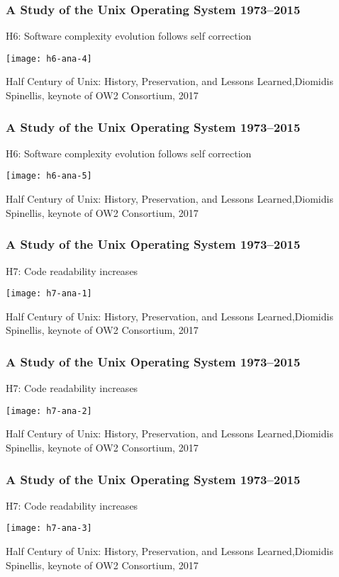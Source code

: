 \begin{frame}[plain]
	\frametitle{A Study of the Unix Operating System 1973–2015}
	\centering
	H6: Software complexity evolution
	follows self correction
	
	\texttt{[image: h6-ana-4]}
	
	\tiny Half Century of Unix:
	History, Preservation, and
	Lessons Learned,Diomidis Spinellis, keynote of OW2 Consortium, 2017
	
\end{frame}	


\begin{frame}[plain]
	\frametitle{A Study of the Unix Operating System 1973–2015}
	\centering
	H6: Software complexity evolution
	follows self correction
	
	\texttt{[image: h6-ana-5]}
	
	\tiny Half Century of Unix:
	History, Preservation, and
	Lessons Learned,Diomidis Spinellis, keynote of OW2 Consortium, 2017
	
\end{frame}	



\begin{frame}[plain]
	\frametitle{A Study of the Unix Operating System 1973–2015}
	\centering
	H7: Code readability increases
	
	\texttt{[image: h7-ana-1]}
	
	\tiny Half Century of Unix:
	History, Preservation, and
	Lessons Learned,Diomidis Spinellis, keynote of OW2 Consortium, 2017
	
\end{frame}

\begin{frame}[plain]
	\frametitle{A Study of the Unix Operating System 1973–2015}
	\centering
	H7: Code readability increases
	
	\texttt{[image: h7-ana-2]}
	
	\tiny Half Century of Unix:
	History, Preservation, and
	Lessons Learned,Diomidis Spinellis, keynote of OW2 Consortium, 2017
	
\end{frame}

\begin{frame}[plain]
	\frametitle{A Study of the Unix Operating System 1973–2015}
	\centering
	H7: Code readability increases
	
	\texttt{[image: h7-ana-3]}
	
	\tiny Half Century of Unix:
	History, Preservation, and
	Lessons Learned,Diomidis Spinellis, keynote of OW2 Consortium, 2017
	
\end{frame}


